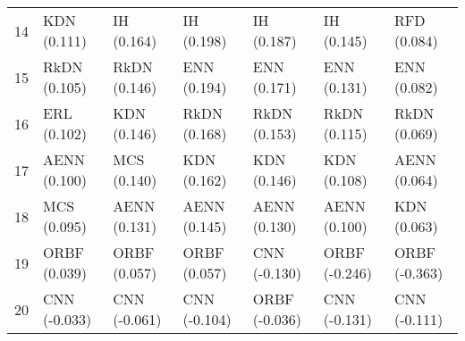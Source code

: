 \begin{tabular}{lllllll}
14   &       KDN (0.111) &        IH (0.164) &        IH (0.198) &        IH (0.187) &        IH (0.145) &       RFD (0.084) \\
15   &      RkDN (0.105) &      RkDN (0.146) &       ENN (0.194) &       ENN (0.171) &       ENN (0.131) &       ENN (0.082) \\
16   &       ERL (0.102) &       KDN (0.146) &      RkDN (0.168) &      RkDN (0.153) &      RkDN (0.115) &      RkDN (0.069) \\
17   &      AENN (0.100) &       MCS (0.140) &       KDN (0.162) &       KDN (0.146) &       KDN (0.108) &      AENN (0.064) \\
18   &       MCS (0.095) &      AENN (0.131) &      AENN (0.145) &      AENN (0.130) &      AENN (0.100) &       KDN (0.063) \\
19   &      ORBF (0.039) &      ORBF (0.057) &      ORBF (0.057) &      CNN (-0.130) &     ORBF (-0.246) &     ORBF (-0.363) \\
20   &      CNN (-0.033) &      CNN (-0.061) &      CNN (-0.104) &     ORBF (-0.036) &      CNN (-0.131) &      CNN (-0.111) \\
\bottomrule
\end{tabular}
